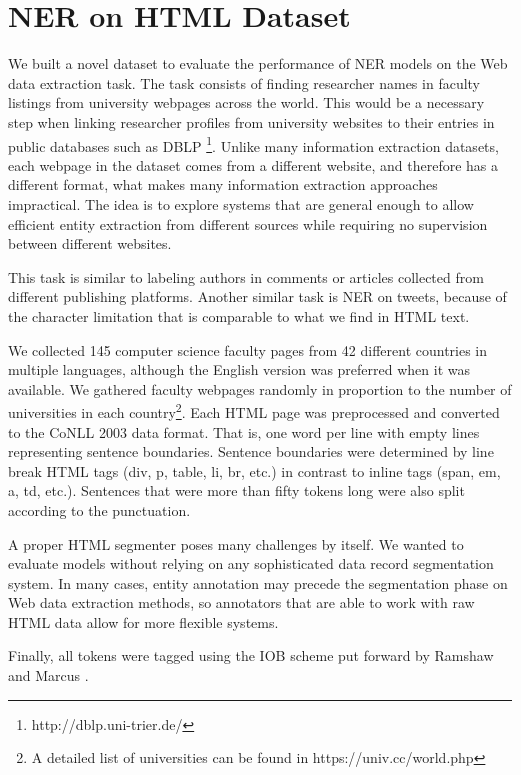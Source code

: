 \documentclass{nle}
\begin{document}
\section{NER on HTML Dataset}
\label{sec:ner_dataset}

We built a novel dataset to evaluate the performance of NER models
on the Web data extraction task. The task consists of finding researcher
names in faculty listings from university webpages across the world. This would be a
necessary step when linking researcher profiles from university websites to their entries
in public databases such as DBLP \footnote{http://dblp.uni-trier.de/}. Unlike many
information extraction datasets, each webpage in the dataset comes from a different 
website, and therefore has a different format, what makes many information
extraction approaches impractical. The idea is to explore systems that are general 
enough to allow efficient entity extraction from different sources while requiring
no supervision between different websites. 

This task is similar to labeling authors in comments or articles collected
from different publishing platforms. Another similar task is NER on tweets,
because of the character limitation that is comparable to what we find in 
HTML text.

We collected 145 computer science faculty pages from 42 different countries in
multiple languages, although the English version was preferred when it was available.
We gathered faculty webpages randomly in proportion to
the number of universities in each country\footnote{A detailed list of universities can
be found in https://univ.cc/world.php}. Each HTML page was preprocessed and converted
to the CoNLL 2003 data format. That is, one word per line with empty lines representing
sentence boundaries. Sentence boundaries were determined by line break HTML tags
(div, p, table, li, br, etc.) in contrast to inline tags (span, em, a, td, etc.). 
Sentences that were more than fifty tokens long were also split according to the
punctuation.

A proper HTML segmenter poses many challenges by itself. We wanted to evaluate 
models without relying on any sophisticated data record segmentation system.
In many cases, entity annotation may precede the segmentation
phase on Web data extraction methods, so annotators that are able to work 
with raw HTML data allow for more flexible systems. 

Finally, all tokens were tagged using the IOB scheme put forward by
Ramshaw and Marcus . 
\end{document}
